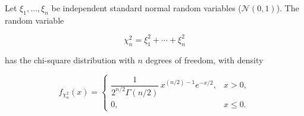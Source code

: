 Let $\xi_1, \ldots, \xi_n$ be independent standard normal random variables ($\mathcal{N}(0,1)$). The random variable

$$\chi_n^2 = \xi_1^2 + \cdots + \xi_n^2$$

has the chi-square distribution with $n$ degrees of freedom, with density

$$f_{\chi_n^2}(x) = \begin{cases} \dfrac{1}{2^{n/2} \Gamma(n/2)} \, x^{(n/2)-1} e^{-x/2}, & x > 0, \\[8pt] 0, & x \leq 0. \end{cases}$$

